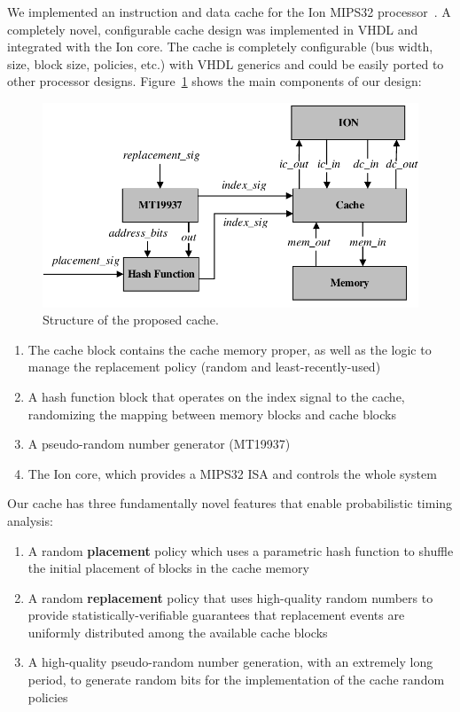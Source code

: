 We implemented an instruction and data cache for the Ion
MIPS32 processor~\cite{ION}. A completely novel, configurable cache
design was implemented in VHDL and integrated with the Ion core. The
cache is completely configurable (bus width, size, block size,
policies, etc.) with VHDL generics and could be easily ported to other
processor designs. Figure~\ref{fig:cache-structure} shows the main components of our design:

\begin{figure}
 \centering
  \captionsetup{justification=centering}    
   \includegraphics[scale=0.2]{figures/img/cache_structure_c.pdf}
   \caption{Structure of the proposed cache.}
\label{fig:cache-structure}
\end{figure}

\begin{enumerate}
\item The cache block contains the cache memory proper, as well as the
logic to manage the replacement policy (random and least-recently-used)
\item A hash function block that operates on the index signal to the
  cache, randomizing the mapping between memory blocks and cache blocks
\item A pseudo-random number generator (MT19937)
\item The Ion core, which provides a MIPS32 ISA and controls the whole
  system
\end{enumerate}

Our cache has three fundamentally novel features that enable probabilistic
timing analysis:
\begin{enumerate}
\item A random \textbf{placement} policy which uses a parametric hash
  function to shuffle the initial placement of blocks in the cache memory
\item A random \textbf{replacement} policy that uses high-quality random
numbers to provide statistically-verifiable guarantees that replacement
events are uniformly distributed among the available cache blocks
\item A high-quality pseudo-random number generation, with an extremely
long period, to generate random bits for the implementation of the cache
random policies
\end{enumerate}
%
%

